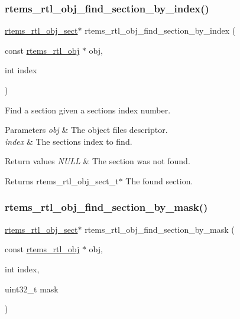 \subsubsection{\texorpdfstring{rtems\_rtl\_obj\_find\_section\_by\_index()}{rtems\_rtl\_obj\_find\_section\_by\_index()}}
{\footnotesize\ttfamily \mbox{\hyperlink{structrtems__rtl__obj__sect}{rtems\+\_\+rtl\+\_\+obj\+\_\+sect}}$\ast$ rtems\+\_\+rtl\+\_\+obj\+\_\+find\+\_\+section\+\_\+by\+\_\+index (\begin{DoxyParamCaption}\item[{const \mbox{\hyperlink{structrtems__rtl__obj}{rtems\+\_\+rtl\+\_\+obj}} $\ast$}]{obj,  }\item[{int}]{index }\end{DoxyParamCaption})}

Find a section given a section\textquotesingle{}s index number.


\begin{DoxyParams}{Parameters}
{\em obj} & The object file\textquotesingle{}s descriptor. \\
\hline
{\em index} & The section\textquotesingle{}s index to find. \\
\hline
\end{DoxyParams}

\begin{DoxyRetVals}{Return values}
{\em N\+U\+LL} & The section was not found. \\
\hline
\end{DoxyRetVals}
\begin{DoxyReturn}{Returns}
rtems\+\_\+rtl\+\_\+obj\+\_\+sect\+\_\+t$\ast$ The found section. 
\end{DoxyReturn}
\mbox{\label{rtl-obj_8h_a99bc60fea183744d2e3553f517bc6d22}} 
\subsubsection{\texorpdfstring{rtems\_rtl\_obj\_find\_section\_by\_mask()}{rtems\_rtl\_obj\_find\_section\_by\_mask()}}
{\footnotesize\ttfamily \mbox{\hyperlink{structrtems__rtl__obj__sect}{rtems\+\_\+rtl\+\_\+obj\+\_\+sect}}$\ast$ rtems\+\_\+rtl\+\_\+obj\+\_\+find\+\_\+section\+\_\+by\+\_\+mask (\begin{DoxyParamCaption}\item[{const \mbox{\hyperlink{structrtems__rtl__obj}{rtems\+\_\+rtl\+\_\+obj}} $\ast$}]{obj,  }\item[{int}]{index,  }\item[{uint32\+\_\+t}]{mask }\end{DoxyParamCaption})}

